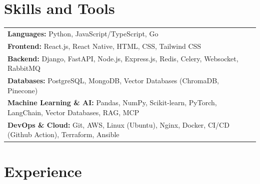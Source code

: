 \documentclass[letterpaper,10pt]{article}
\newenvironment{resume_list}{
  \vspace{-7pt}
  \begin{itemize}[itemsep=-2px, parsep=1pt, leftmargin=30pt]
}{
  \end{itemize}
}
\begin{document}






\section{Skills and Tools}
\begin{tabularx}{\textwidth}{@{\hspace{10pt}}X @{\hspace{20pt}}X}
  \textbf{Languages:}  Python, JavaScript/TypeScript, Go \\
  \textbf{Frontend:}  React.js, React Native, HTML, CSS, Tailwind CSS \\
  \textbf{Backend:}  Django, FastAPI, Node.js, Express.js, Redis, Celery, Websocket, RabbitMQ \\
  \textbf{Databases:} PostgreSQL, MongoDB, Vector Databases (ChromaDB, Pinecone) \\
  \textbf{Machine Learning \& AI:} Pandas, NumPy, Scikit-learn, PyTorch, LangChain, Vector Databases, RAG, MCP \\
  \textbf{DevOps \& Cloud:}  Git, AWS, Linux (Ubuntu), Nginx, Docker, CI/CD (Github Action), Terraform, Ansible \\
\end{tabularx}




  \section{Experience}
  
\end{document}
